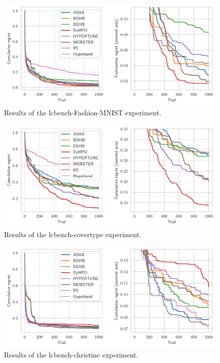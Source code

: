 \begin{figure}[H]
    \centering
    \includegraphics[scale=0.65]{img/tabular_exp/lcbench-Fashion-MNIST_plot.pdf}
    \caption{Results of the lcbench-Fashion-MNIST experiment.}
\end{figure}

\begin{figure}[H]
    \centering
    \includegraphics[scale=0.65]{img/tabular_exp/lcbench-covertype_plot.pdf}
    \caption{Results of the lcbench-covertype experiment.}
\end{figure}

\begin{figure}[H]
    \centering
    \includegraphics[scale=0.65]{img/tabular_exp/lcbench-christine_plot.pdf}
    \caption{Results of the lcbench-christine experiment.}
\end{figure}

